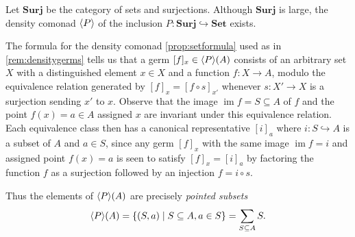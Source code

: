\documentclass[11pt, oneside, article]{memoir}
\theoremstyle{plain}
\theoremstyle{definition}
\theoremstyle{remark}
\newenvironment{example}
{\renewcommand\qedsymbol{$\lrcorner$}%
  \pushQED{\qed}\myexample}
{\popQED\endmyexample}
\DeclareMathOperator{\im}{im}
\DeclarePairedDelimiter{\gen}{\langle}{\rangle}
\newcommand{\namedcat}[1]{\mathbf{#1}}
\newcommand{\Set}{\namedcat{Set}}
\newcommand{\Surj}{\namedcat{Surj}}
\newcommand{\ph}[1]{#1}
\newcommand{\setof}[1]{\{#1\}}
\newcommand{\xA}{A}
\newcommand{\xS}{S}
\newcommand{\xX}{X}
\newcommand{\pP}{\ph{P}}
\newcommand{\cP}{\gen{\pP}}
\begin{document}
\begin{example}[Partitions]\label{ex:part}
  Let $\Surj$ be the category of sets and surjections.  Although
  $\Surj$ is large, the density comonad $\cP$ of the inclusion
  $\pP \colon \Surj \hookrightarrow \Set$ exists.

  The formula for the density comonad \cref{prop:setformula} used as
  in \cref{rem:densitygerms} tells us that a germ $[f]_x \in \cP(\xA)$
  consists of an arbitrary set $\xX$ with a distinguished element
  $x \in \xX$ and a function $f \colon \xX \to \xA$, modulo the
  equivalence relation generated by $[f]_x = [f\circ s]_{x'}$ whenever
  $s \colon \xX' \to \xX$ is a surjection sending $x'$ to $x$. Observe
  that the image $\im f = \xS \subseteq \xA$ of $f$ and the point
  $f(x) = a \in \xA$ assigned $x$ are invariant under this equivalence
  relation. Each equivalence class then has a canonical representative
  $[i]_a$ where $i \colon \xS \hookrightarrow \xA$ is a subset of
  $\xA$ and $a \in \xS$, since any germ $[f]_x$ with the same image
  $\im f = i$ and assigned point $f(x) = a$ is seen to satisfy
  $[f]_x = [i]_a$ by factoring the function $f$ as a surjection
  followed by an injection $f = i \circ s$.

  Thus the elements of $\cP(\xA)$ are precisely \emph{pointed subsets}
  \[\cP(\xA) = \setof{(\xS, a) \mid \xS \subseteq \xA, a \in \xS} = \sum_{\xS \subseteq \xA} \xS.\]


\end{example}
\end{document}
